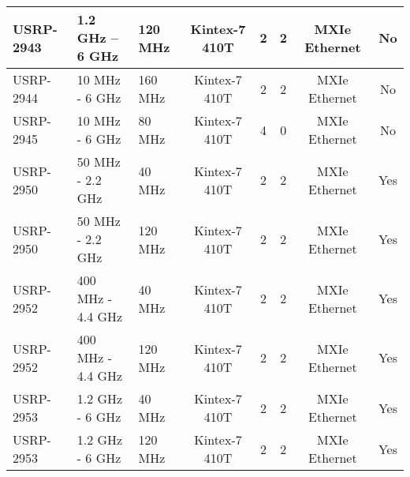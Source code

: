 \begin{landscape}
\begin{table}[htb]
\begin{center}
\begin{tabular}{|l|l|l|c|c|c|c|c|}
                USRP-2943      & 1.2 \si{\giga\hertz} – 6 \si{\giga\hertz}             & 120 \si{\mega\hertz}                               & Kintex-7 410T & 2               & 2                & MXIe Ethernet          & No                     \\ \hline
                USRP-2944      & 10 \si{\mega\hertz} - 6 \si{\giga\hertz}              & 160 \si{\mega\hertz}                               & Kintex-7 410T & 2               & 2                & MXIe Ethernet          & No                     \\ \hline
                USRP-2945      & 10 \si{\mega\hertz} - 6 \si{\giga\hertz}              & 80 \si{\mega\hertz}                                & Kintex-7 410T & 4               & 0                & MXIe Ethernet          & No                     \\ \hline
                USRP-2950      & 50 \si{\mega\hertz} - 2.2 \si{\giga\hertz}            & 40 \si{\mega\hertz}                                & Kintex-7 410T & 2               & 2                & MXIe Ethernet          & Yes                    \\ \hline
                USRP-2950      & 50 \si{\mega\hertz} - 2.2 \si{\giga\hertz}            & 120 \si{\mega\hertz}                               & Kintex-7 410T & 2               & 2                & MXIe Ethernet          & Yes                    \\ \hline
                USRP-2952      & 400 \si{\mega\hertz} - 4.4 \si{\giga\hertz}           & 40 \si{\mega\hertz}                                & Kintex-7 410T & 2               & 2                & MXIe Ethernet          & Yes                    \\ \hline
                USRP-2952      & 400 \si{\mega\hertz} - 4.4 \si{\giga\hertz}           & 120 \si{\mega\hertz}                               & Kintex-7 410T & 2               & 2                & MXIe Ethernet          & Yes                    \\ \hline
                USRP-2953      & 1.2 \si{\giga\hertz} - 6 \si{\giga\hertz}             & 40 \si{\mega\hertz}                                & Kintex-7 410T & 2               & 2                & MXIe Ethernet          & Yes                    \\ \hline
                USRP-2953      & 1.2 \si{\giga\hertz} - 6 \si{\giga\hertz}             & 120 \si{\mega\hertz}                               & Kintex-7 410T & 2               & 2                & MXIe Ethernet          & Yes                    \\ \hline

\end{tabular}
\end{center}
\end{table}
\end{landscape}
